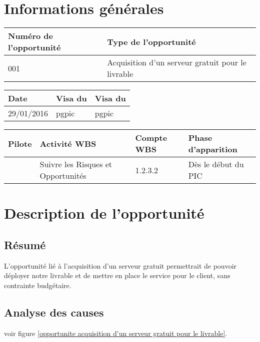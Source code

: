 
\section*{Informations générales}
 
\begin{table}[h]
\centering
	\begin{tabularx}{16.8cm}{|X|X|}
	\hline
	\rowcolor{gray!40} Numéro de l'opportunité & Type de l'opportunité \\
	\hline
	001 & Acquisition d'un serveur gratuit pour le livrable \\
	\hline
	\end{tabularx}
\end{table}

\begin{table}[H]
\centering
	\begin{tabularx}{16.8cm}{|X|X|X|}
	\hline
	\rowcolor{gray!40} Date & Visa du \RQ & Visa du \CP \\
	\hline
	 29/01/2016 & pgpic & pgpic \\
	\hline
	\end{tabularx}
\end{table}

\begin{table}[h]
\centering
	\begin{tabularx}{16.8cm}{|X|X|X|X|}
	\hline
	\rowcolor{gray!40} Pilote & Activité WBS & Compte WBS & Phase d'apparition \\
	\hline
	 \Matthieu & Suivre les Risques et Opportunités & 1.2.3.2 & Dès le début du PIC\\
	\hline
	\end{tabularx}
\end{table}

\section*{Description de l'opportunité}

\subsection*{Résumé}
	L'opportunité lié à l'acquisition d'un serveur gratuit permettrait de pouvoir déployer notre livrable et de mettre en place le service pour le client, sans contrainte budgétaire.
	
\subsection*{Analyse des causes}
	voir figure \ref{opportunite acquisition d'un serveur gratuit pour le livrable}.

